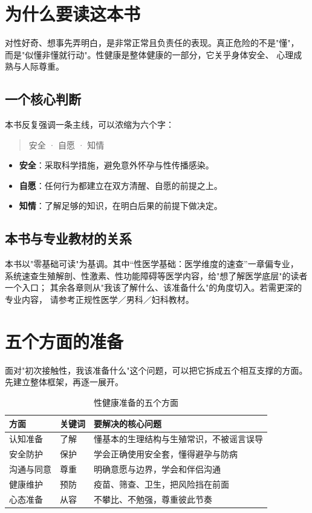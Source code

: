 \documentclass[12pt,UTF8,openany]{ctexbook}
\begin{document}
\tableofcontents
\clearpage
\chapter{为什么要读这本书}

对性好奇、想事先弄明白，是非常正常且负责任的表现。真正危险的不是"懂"，
而是"似懂非懂就行动"。性健康是整体健康的一部分，它关乎身体安全、
心理成熟与人际尊重。

\section{一个核心判断}

本书反复强调一条主线，可以浓缩为六个字：

\begin{quote}
\centering \myhei{}\textcolor{myblue}{安全 · 自愿 · 知情}
\end{quote}

\begin{itemize}
  \item \textbf{安全}：采取科学措施，避免意外怀孕与性传播感染。
  \item \textbf{自愿}：任何行为都建立在双方清醒、自愿的前提之上。
  \item \textbf{知情}：了解足够的知识，在明白后果的前提下做决定。
\end{itemize}

\section{本书与专业教材的关系}

本书以"零基础可读"为基调。其中“性医学基础：医学维度的速查”一章偏专业，
系统速查生殖解剖、性激素、性功能障碍等医学内容，给"想了解医学底层"的读者一个入口；
其余各章则从"我该了解什么、该准备什么"的角度切入。若需更深的专业内容，
请参考正规性医学／男科／妇科教材。

\chapter{五个方面的准备}

面对"初次接触性，我该准备什么"这个问题，可以把它拆成五个相互支撑的方面。
先建立整体框架，再逐一展开。

\begin{table}[htbp]
  \centering
  \caption{性健康准备的五个方面}
  \begin{tabularx}{\textwidth}{@{}l l X@{}}
    \toprule
    \textbf{方面} & \textbf{关键词} & \textbf{要解决的核心问题} \\
    \midrule
    认知准备   & 了解       & 懂基本的生理结构与生殖常识，不被谣言误导 \\
    安全防护   & 保护       & 学会正确使用安全套，懂得避孕与防病 \\
    沟通与同意 & 尊重       & 明确意愿与边界，学会和伴侣沟通 \\
    健康维护   & 预防       & 疫苗、筛查、卫生，把风险挡在前面 \\
    心态准备   & 从容       & 不攀比、不勉强，尊重彼此节奏 \\
    \bottomrule
  \end{tabularx}
\end{table}
\end{document}
